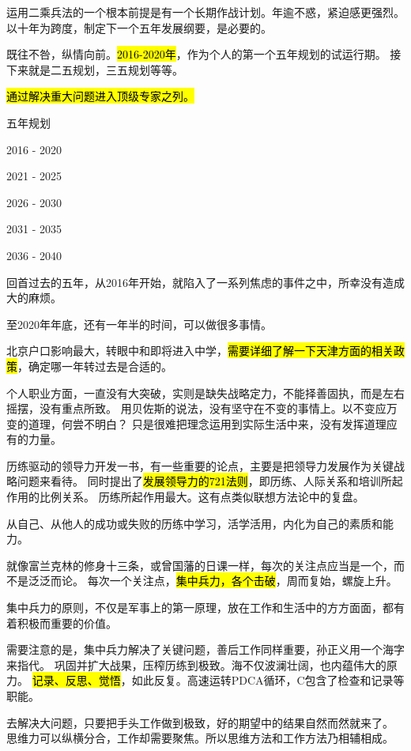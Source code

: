 运用二乘兵法的一个根本前提是有一个长期作战计划。年逾不惑，紧迫感更强烈。
以十年为跨度，制定下一个五年发展纲要，是必要的。

既往不咎，纵情向前。\hl{2016-2020年}，作为个人的第一个五年规划的试运行期。
接下来就是二五规划，三五规划等等。

\hl{通过解决重大问题进入顶级专家之列。}

五年规划
\begin{enumbox}
\item 2016 - 2020
\item 2021 - 2025
\item 2026 - 2030
\item 2031 - 2035
\item 2036 - 2040
\end{enumbox}

\hrulefill

回首过去的五年，从2016年开始，就陷入了一系列焦虑的事件之中，所幸没有造成大的麻烦。

至2020年年底，还有一年半的时间，可以做很多事情。

北京户口影响最大，转眼中和即将进入中学，\hl{需要详细了解一下天津方面的相关政策}，确定哪一年转过去是合适的。

个人职业方面，一直没有大突破，实则是缺失战略定力，不能择善固执，而是左右摇摆，没有重点所致。
用贝佐斯的说法，没有坚守在不变的事情上。以不变应万变的道理，何尝不明白？
只是很难把理念运用到实际生活中来，没有发挥道理应有的力量。

历练驱动的领导力开发一书，有一些重要的论点，主要是把领导力发展作为关键战略问题来看待。
同时提出了\hl{发展领导力的721法则}，即历练、人际关系和培训所起作用的比例关系。
历练所起作用最大。这有点类似联想方法论中的复盘。

从自己、从他人的成功或失败的历练中学习，活学活用，内化为自己的素质和能力。

就像富兰克林的修身十三条，或曾国藩的日课一样，每次的关注点应当是一个，而不是泛泛而论。
每次一个关注点，\hl{集中兵力，各个击破}，周而复始，螺旋上升。

集中兵力的原则，不仅是军事上的第一原理，放在工作和生活中的方方面面，都有着积极而重要的价值。

需要注意的是，集中兵力解决了关键问题，善后工作同样重要，孙正义用一个海字来指代。
巩固并扩大战果，压榨历练到极致。海不仅波澜壮阔，也内蕴伟大的原力。
\hl{记录、反思、觉悟}，如此反复。高速运转PDCA循环，C包含了检查和记录等职能。

去解决大问题，只要把手头工作做到极致，好的期望中的结果自然而然就来了。
思维力可以纵横分合，工作却需要聚焦。所以思维方法和工作方法乃相辅相成。

